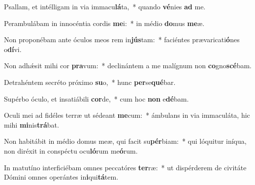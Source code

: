 \item Psallam, et intélligam in via immacu\textbf{lá}ta,~* quando \textbf{vé}nies \textbf{ad} me.
\item Perambulábam in innocéntia cordis \textbf{me}i:~* in médio \textbf{do}mus \textbf{me}æ.
\item Non proponébam ante óculos meos rem in\textbf{jús}tam:~* faciéntes prævaricati\textbf{ó}nes o\textbf{dí}vi.
\item Non adhǽsit mihi cor \textbf{pra}vum:~* declinántem a me malígnum non \textbf{co}gno\textbf{scé}bam.
\item Detrahéntem secréto próximo \textbf{su}o,~* hunc \textbf{per}se\textbf{qué}bar.
\item Supérbo óculo, et insatiábili \textbf{cor}de,~* cum hoc \textbf{non} e\textbf{dé}bam.
\item Oculi mei ad fidéles terræ ut sédeant \textbf{me}cum:~* ámbulans in via immaculáta, hic mihi \textbf{mi}nis\textbf{trá}bat.
\item Non habitábit in médio domus meæ, qui facit su\textbf{pér}biam:~* qui lóquitur iníqua, non diréxit in conspéctu ocu\textbf{ló}rum me\textbf{ó}rum.
\item In matutíno interficiébam omnes peccatóres \textbf{ter}ræ:~* ut dispérderem de civitáte Dómini omnes operántes in\textbf{i}qui\textbf{tá}tem.
